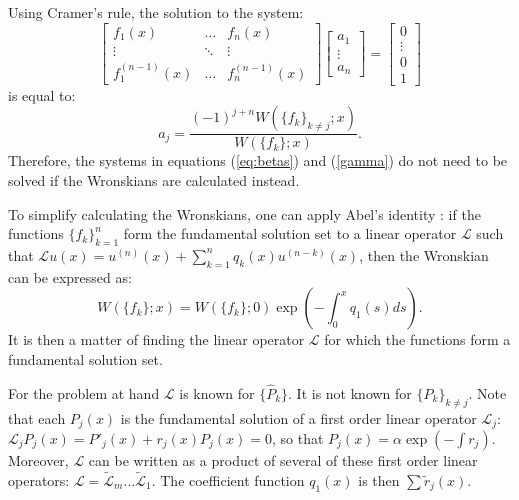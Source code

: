 \documentclass{book}
\begin{document}
Using Cramer's rule, the solution to the system:
\begin{equation}
\begin{bmatrix} f_1(x) & \dots & f_n(x) \\ \vdots & \ddots & \vdots \\ f^{(n-1)}_1(x) & \dots & f_n^{(n-1)}(x) \end{bmatrix} 
\begin{bmatrix} a_1 \\ \vdots \\ a_n \end{bmatrix} =
\begin{bmatrix} 0 \\ \vdots \\ 0 \\ 1 \end{bmatrix}
\end{equation}
is equal to:
\begin{equation} \label{eq:Wronskian coeffs}
a_j = \frac{ (-1)^{j+n} W( \{ f_k \}_{k \neq j} ; x) }{ W( \{ f_k \} ; x ) } .
\end{equation}
Therefore, the systems in equations (\ref{eq:betas}) and (\ref{gamma}) do not need to be solved if the Wronskians are calculated instead.


To simplify calculating the Wronskians, one can apply Abel's identity \cite{Abel, BoyceDiPrima}:
if the functions $\{ f_k \}_{k=1}^n$ form the fundamental solution set to a linear operator $\mathcal{L}$ such that 
$\mathcal{L} u(x) = u^{(n)}(x) + \sum_{k=1}^n q_k(x) u^{(n - k)}(x)$, then the Wronskian can be expressed as:
\begin{equation}
W(\{f_k\}; x) = W(\{f_k\}; 0) \exp \left ({ - \int_{0}^x q_1(s) ds } \right ).
\end{equation}
It is then a matter of finding the linear operator $\mathcal{L}$ for which the functions form a fundamental solution set.

For the problem at hand $\mathcal{L}$ is known for $\{ \hat{P}_k \}$.
It is not known for $\{ \hat{P}_k \}_{k\neq j}$.
Note that each $P_j(x)$ is the fundamental solution of a first order linear operator $\mathcal{L}_j$:
$\mathcal{L}_j P_j(x) = P'_j(x) + r_j(x) P_j(x) = 0$, so that $P_j(x) = \alpha \exp \left ( - \int r_j \right )$.
Moreover, $\mathcal{L}$ can be written as a product of several of these first order linear operators:
$\mathcal{L} = \tilde{\mathcal{L}}_m \dots \tilde{\mathcal{L}}_1$.
The coefficient function $q_1(x)$ is then $\sum \tilde{r}_j(x)$.
\end{document}
